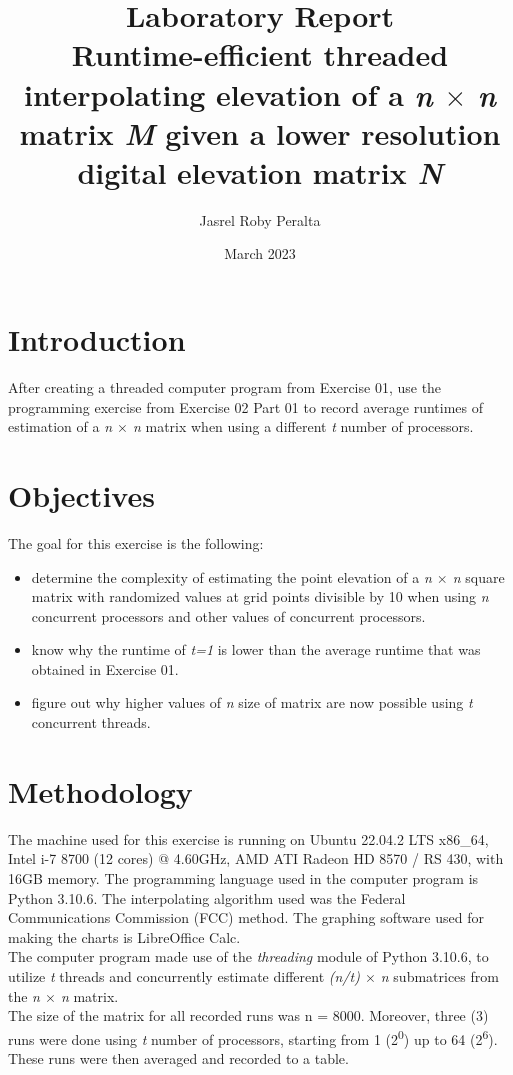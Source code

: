\documentclass{article}
\title{
\textbf{Laboratory Report} \\
\large Runtime-efficient threaded interpolating elevation of a \emph{n $\times$ n} matrix \emph{M} given a lower resolution digital elevation matrix \emph{N}
}
\author{Jasrel Roby Peralta}
\date{March 2023}
\begin{document}
\maketitle

\section*{Introduction}
\hspace{\parindent} After creating a threaded computer program from Exercise 01, use the programming exercise from Exercise 02 Part 01 to record average runtimes of estimation of a \emph{n $\times$ n} matrix when using a different \emph{t} number of processors.

\section*{Objectives}
The goal for this exercise is the following:
\begin{itemize}
    \item determine the complexity of estimating the point elevation of a \emph{n $\times$ n} square matrix with randomized values at grid points divisible by 10 when using \emph{n} concurrent processors and other values of concurrent processors.
    \item know why the runtime of \emph{t=1} is lower than the average runtime that was obtained in Exercise 01.
    \item figure out why higher values of \emph{n} size of matrix are now possible using \emph{t} concurrent threads.
\end{itemize}

\section*{Methodology} 
\hspace{\parindent} The machine used for this exercise is running on Ubuntu 22.04.2 LTS x86\_64, Intel i-7 8700 (12 cores) @ 4.60GHz, AMD ATI Radeon HD 8570 / RS 430, with 16GB memory. The programming language used in the computer program is Python 3.10.6. The interpolating algorithm used was the Federal Communications Commission (FCC) method. The graphing software used for making the charts is LibreOffice Calc. \\
\indent The computer program made use of the \emph{threading} module of Python 3.10.6, to utilize \emph{t} threads and concurrently estimate different \emph{(n/t) $\times$ n} submatrices from the \emph{n $\times$ n} matrix. \\ 
\indent The size of the matrix for all recorded runs was n = 8000. Moreover, three (3) runs were done using \emph{t} number of processors, starting from 1 (2\textsuperscript{0}) up to 64 (2\textsuperscript{6}). These runs were then averaged and recorded to a table.
\end{document}
